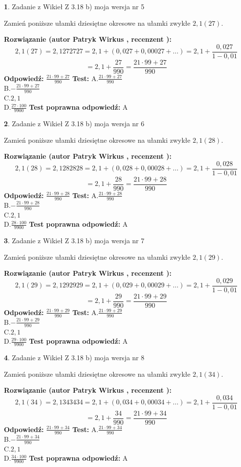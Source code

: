 \documentclass[12pt, a4paper]{article}
\theoremstyle{definition} %
\newtheorem{zad}{}
\newcommand{\zadStart}[1]{\begin{zad}#1\newline}
\newcommand{\zadStop}{\end{zad}}
\newcommand{\rozwStart}[2]{\noindent \textbf{Rozwiązanie (autor #1 , recenzent #2): }\newline}
\newcommand{\rozwStop}{\newline}
\newcommand{\odpStart}{\noindent \textbf{Odpowiedź:}\newline}
\newcommand{\odpStop}{\newline}
\newcommand{\testStart}{\noindent \textbf{Test:}\newline}
\newcommand{\testStop}{\newline}
\newcommand{\kluczStart}{\noindent \textbf{Test poprawna odpowiedź:}\newline}
\newcommand{\kluczStop}{\newline}
\begin{document}
\zadStart{Zadanie z Wikieł Z 3.18 b) moja wersja nr 5}

Zamień poniższe ułamki dziesiętne okresowe na ułamki zwykłe $2,1(27)$.
\zadStop
\rozwStart{Patryk Wirkus}{}
$$2,1(27)=2,1272727=2,1+(0,027+0,00027+...)=2,1+\frac{0,027}{1-0,01}$$
$$=2,1+\frac{27}{990}=\frac{21\cdot99+27}{990}$$
\rozwStop
\odpStart
$\frac{21\cdot99+27}{990}$
\odpStop
\testStart
A.$\frac{21\cdot99+27}{990}$\\ B.$-\frac{21\cdot99+27}{990}$\\ C.$2,1$\\ D.$\frac{27\cdot100}{9900}$
\testStop
\kluczStart
A
\kluczStop



\zadStart{Zadanie z Wikieł Z 3.18 b) moja wersja nr 6}

Zamień poniższe ułamki dziesiętne okresowe na ułamki zwykłe $2,1(28)$.
\zadStop
\rozwStart{Patryk Wirkus}{}
$$2,1(28)=2,1282828=2,1+(0,028+0,00028+...)=2,1+\frac{0,028}{1-0,01}$$
$$=2,1+\frac{28}{990}=\frac{21\cdot99+28}{990}$$
\rozwStop
\odpStart
$\frac{21\cdot99+28}{990}$
\odpStop
\testStart
A.$\frac{21\cdot99+28}{990}$\\ B.$-\frac{21\cdot99+28}{990}$\\ C.$2,1$\\ D.$\frac{28\cdot100}{9900}$
\testStop
\kluczStart
A
\kluczStop



\zadStart{Zadanie z Wikieł Z 3.18 b) moja wersja nr 7}

Zamień poniższe ułamki dziesiętne okresowe na ułamki zwykłe $2,1(29)$.
\zadStop
\rozwStart{Patryk Wirkus}{}
$$2,1(29)=2,1292929=2,1+(0,029+0,00029+...)=2,1+\frac{0,029}{1-0,01}$$
$$=2,1+\frac{29}{990}=\frac{21\cdot99+29}{990}$$
\rozwStop
\odpStart
$\frac{21\cdot99+29}{990}$
\odpStop
\testStart
A.$\frac{21\cdot99+29}{990}$\\ B.$-\frac{21\cdot99+29}{990}$\\ C.$2,1$\\ D.$\frac{29\cdot100}{9900}$
\testStop
\kluczStart
A
\kluczStop



\zadStart{Zadanie z Wikieł Z 3.18 b) moja wersja nr 8}

Zamień poniższe ułamki dziesiętne okresowe na ułamki zwykłe $2,1(34)$.
\zadStop
\rozwStart{Patryk Wirkus}{}
$$2,1(34)=2,1343434=2,1+(0,034+0,00034+...)=2,1+\frac{0,034}{1-0,01}$$
$$=2,1+\frac{34}{990}=\frac{21\cdot99+34}{990}$$
\rozwStop
\odpStart
$\frac{21\cdot99+34}{990}$
\odpStop
\testStart
A.$\frac{21\cdot99+34}{990}$\\ B.$-\frac{21\cdot99+34}{990}$\\ C.$2,1$\\ D.$\frac{34\cdot100}{9900}$
\testStop
\kluczStart
A
\kluczStop
\end{document}
